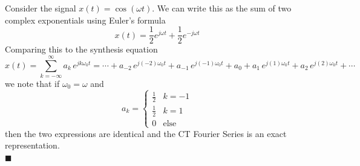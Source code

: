 \begin{example}
  Consider the signal $x(t) = \cos(\omega t)$. We can write this as the sum of two complex exponentials using Euler's formula
  \[
  x(t) = \frac{1}{2}e^{j\omega t} + \frac{1}{2}e^{-j\omega t} 
  \]
  Comparing this to the synthesis equation
  \[
  x(t) = \sum\limits_{k = -\infty}^{\infty} a_k \, e^{j k\omega_0 t} = \cdots + a_{-2} \, e^{j (-2)\omega_0 t} + a_{-1} \, e^{j (-1)\omega_0 t} + a_0 + a_{1} \, e^{j (1)\omega_0 t} + a_{2} \, e^{j (2)\omega_0 t} + \cdots
  \]
  we note that if $\omega_0 = \omega$ and 
  \[
  a_k = \left\{ \begin{array}{lc}
    \tfrac{1}{2} & k = -1\\[0.5em]
    \tfrac{1}{2} & k = 1\\[0.5em]
    0 & \text{else}
  \end{array}
  \right.
  \]
  then the two expressions are identical and the CT Fourier Series is an exact representation.\\
  $\blacksquare$
\end{example}

